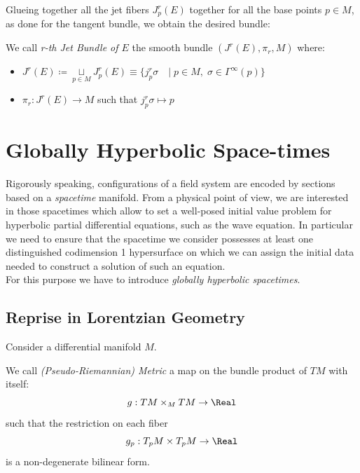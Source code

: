 \documentclass[Main]{subfiles}
\begin{document}
		Glueing together all the jet fibers $J^r_p (E)$ together for all the base points $p\in M$, as done for the tangent bundle,  we obtain the desired bundle:
		\begin{definition}
			We call \emph{r-th Jet Bundle of $E$} the smooth bundle $(J^r(E), \pi_r, M)$	where:
			\begin{itemize}
				\item $J^r(E) \coloneqq \underset{p \in M}{\sqcup} J^r_p (E)
					 \equiv \big\{j^r_p\sigma \quad \vert \; p\in M, \; \sigma \in \Gamma^\infty(p) \big\}$
				\item $\pi_r: J^r(E) \rightarrow M$ such that $j^{r}_{p}\sigma \mapsto p $
			\end{itemize}
		\end{definition}

	\section{Globally Hyperbolic Space-times}
		Rigorously speaking, configurations of a field system are encoded by sections based on a \emph{spacetime} manifold.
		From a physical point of view, we are interested in those spacetimes which allow to set a well-posed initial value problem for hyperbolic partial differential equations, such as the wave equation.
		 In particular we need to ensure that the spacetime we consider possesses at least one distinguished codimension 1 hypersurface on which we can assign the initial data needed to construct a solution of such an equation.
	 	\\
	 	For this purpose we have to  introduce \emph{globally hyperbolic spacetimes}.

		\subsection{Reprise in Lorentzian Geometry}
			Consider a differential manifold $M$.
			
			\begin{definition}
				We call \emph{(Pseudo-Riemannian) Metric} a map on the bundle product of $TM$ with itself: 
				$$g: TM \times_M TM \rightarrow \Real$$ 
				such that the restriction on each fiber $$g_p: T_pM \times T_pM \rightarrow \Real $$ is a non-degenerate bilinear form.
			\end{definition}
			
\end{document}
